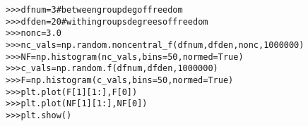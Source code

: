 \begin{boxedminipage}{\funcwidth}
\begin{alltt}
{\textgreater}{\textgreater}{\textgreater} dfnum = 3 \# between group deg of freedom
{\textgreater}{\textgreater}{\textgreater} dfden = 20 \# within groups degrees of freedom
{\textgreater}{\textgreater}{\textgreater} nonc = 3.0
{\textgreater}{\textgreater}{\textgreater} nc\_vals = np.random.noncentral\_f(dfnum, dfden, nonc, 1000000)
{\textgreater}{\textgreater}{\textgreater} NF = np.histogram(nc\_vals, bins=50, normed=True)
{\textgreater}{\textgreater}{\textgreater} c\_vals = np.random.f(dfnum, dfden, 1000000)
{\textgreater}{\textgreater}{\textgreater} F = np.histogram(c\_vals, bins=50, normed=True)
{\textgreater}{\textgreater}{\textgreater} plt.plot(F[1][1:], F[0])
{\textgreater}{\textgreater}{\textgreater} plt.plot(NF[1][1:], NF[0])
{\textgreater}{\textgreater}{\textgreater} plt.show()
\end{alltt}

\setlength{\parskip}{1ex}
    \end{boxedminipage}

    \label{QSTK:qstklearn:mldiagnostics:normal}

    \vspace{0.5ex}

